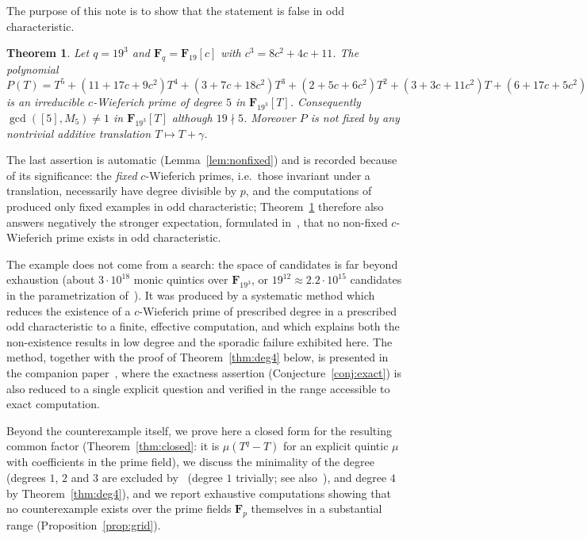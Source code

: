 \documentclass[10pt,a4paper]{amsart}
\newcommand{\F}{\mathbf{F}}
\newtheorem{theorem}{Theorem}[section]
\begin{document}
The purpose of this note is to show that the statement is false in odd
characteristic.

\begin{theorem}\label{thm:main}
Let $q=19^3$ and $\F_q=\F_{19}[c]$ with $c^3=8c^2+4c+11$. The polynomial
\[
P(T)=T^5+(11+17c+9c^2)T^4+(3+7c+18c^2)T^3+(2+5c+6c^2)T^2+(3+3c+11c^2)T+(6+17c+5c^2)
\]
is an irreducible $c$-Wieferich prime of degree $5$ in $\F_{19^3}[T]$.
Consequently $\gcd([5],M_5)\neq1$ in $\F_{19^3}[T]$ although $19\nmid5$.
Moreover $P$ is not fixed by any nontrivial additive translation
$T\mapsto T+\gamma$.
\end{theorem}

The last assertion is automatic (Lemma~\ref{lem:nonfixed}) and is recorded
because of its significance: the \emph{fixed} $c$-Wieferich primes, i.e.\ those
invariant under a translation, necessarily have degree divisible by $p$, and
the computations of~\cite{BB} produced only fixed examples in odd
characteristic; Theorem~\ref{thm:main} therefore also answers negatively the
stronger expectation, formulated in~\cite{BB}, that no non-fixed $c$-Wieferich
prime exists in odd characteristic.

The example does not come from a search: the space of candidates is far beyond
exhaustion (about $3\cdot10^{18}$ monic quintics over $\F_{19^3}$, or
$19^{12}\approx2.2\cdot10^{15}$ candidates in the parametrization
of~\cite[Thm.~3.4]{BB}). It was produced by a systematic method which reduces
the existence of a $c$-Wieferich prime of prescribed degree in a prescribed odd
characteristic to a finite, effective computation, and which explains both the
non-existence results in low degree and the sporadic failure exhibited here.
The method, together with the proof of Theorem~\ref{thm:deg4} below, is
presented in the companion paper~\cite{NG2}, where the exactness assertion
(Conjecture~\ref{conj:exact}) is also reduced to a single explicit question and
verified in the range accessible to exact computation.

Beyond the counterexample itself, we prove here a closed form for the resulting
common factor (Theorem~\ref{thm:closed}: it is $\mu(T^q-T)$ for an explicit
quintic $\mu$ with coefficients in the prime field), we discuss the minimality
of the degree (degrees $1$, $2$ and $3$ are excluded by~\cite{Tha15} (degree
$1$ trivially; see also~\cite{Bam17}), and degree $4$ by
Theorem~\ref{thm:deg4}), and we report exhaustive computations showing that no
counterexample exists over the prime fields $\F_p$ themselves in a substantial
range (Proposition~\ref{prop:grid}).
\end{document}
